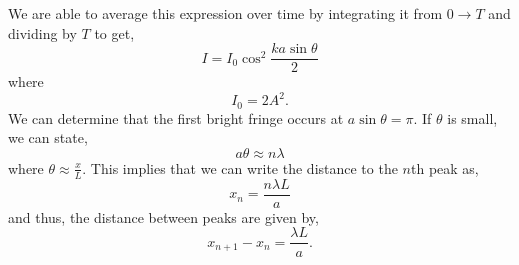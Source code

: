 \documentclass{book}
\begin{document}
We are able to average this expression over time by integrating it from $0 \to T$ and dividing by $T$ to get,
\begin{equation}
	I = I_0\cos^2\frac{ka\sin\theta}{2}
\end{equation}
where
\begin{equation}
	I_0 = 2A^2.
\end{equation}
We can determine that the first bright fringe occurs at $a \sin\theta = \pi$. If $\theta$ is small, we can state,
\begin{equation}
	a\theta \approx n\lambda
\end{equation} 
where $\theta \approx \frac{x}{L}$. This implies that we can write the distance to the $n$th peak as,
\begin{equation}
	x_n = \frac{n\lambda L}{a}
\end{equation}
and thus, the distance between peaks are given by,
\begin{equation}
	x_{n+1} - x_n = \frac{\lambda L}{a}.
\end{equation}
\end{document}
